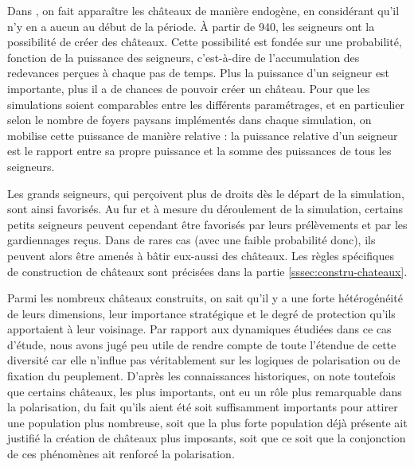 \begin{tcolorbox}[breakable,left=0pt,right=0pt,top=0pt,bottom=0pt,
	colback=gray!15,colframe=gray!15,width=\dimexpr\textwidth\relax, 
	enlarge left by=0mm, boxsep=5pt,arc=0pt,outer arc=0pt]
	
	Dans \simfeodal{}, on fait apparaître les châteaux de manière endogène, en considérant qu'il n'y en a aucun au début de la période.
	À partir de 940, les seigneurs ont la possibilité de créer des châteaux.
	Cette possibilité est fondée sur une probabilité, fonction de la puissance des seigneurs, c'est-à-dire de l'accumulation des redevances perçues à chaque pas de temps.
	Plus la puissance d'un seigneur est importante, plus il a de chances de pouvoir créer un château.
	Pour que les simulations soient comparables entre les différents paramétrages, et en particulier selon le nombre de foyers paysans implémentés dans chaque simulation, on mobilise cette puissance de manière relative : la puissance relative d'un seigneur est le rapport entre sa propre puissance et la somme des puissances de tous les seigneurs.
	
	\medskip
	Les grands seigneurs, qui perçoivent plus de droits dès le départ de la simulation, sont ainsi favorisés.
	Au fur et à mesure du déroulement de la simulation, certains petits seigneurs peuvent cependant être favorisés par leurs prélèvements et par les gardiennages reçus.
	Dans de rares cas (avec une faible probabilité donc), ils peuvent alors être amenés à bâtir eux-aussi des châteaux.
	Les règles spécifiques de construction de châteaux sont précisées dans la partie \cref{sssec:constru-chateaux}.
	
\end{tcolorbox}

Parmi les nombreux châteaux construits, on sait qu'il y a une forte hétérogénéité de leurs dimensions, leur importance stratégique et le degré de protection qu'ils apportaient à leur voisinage.
Par rapport aux dynamiques étudiées dans ce cas d'étude, nous avons jugé peu utile de rendre compte de toute l'étendue de cette diversité car elle n'influe pas véritablement sur les logiques de polarisation ou de fixation du peuplement.
D'après les connaissances historiques, on note toutefois que certains châteaux, les plus importants, ont eu un rôle plus remarquable dans la polarisation, du fait qu'ils aient été soit suffisamment importants pour attirer une population plus nombreuse, soit que la plus forte population déjà présente ait justifié la création de châteaux plus imposants, soit que ce soit que la conjonction de ces phénomènes ait renforcé la polarisation.

